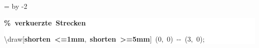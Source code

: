 \begingroup
\ttfamily
{}
=\textwidth
\advance{} by -2\fboxsep
\noindent
\colorbox{background}
{%
\parbox{\dimen255}
{%
\rule[-0.5ex]{0pt}{2.5ex}\hspace*{0.0em}\textcolor{G}{\textbf{\%~verkuerzte~Strecken}}\\
\rule[-0.5ex]{0pt}{2.5ex}\hspace*{0.0em}\textbackslash{}draw[\textcolor{R}{\textbf{shorten~{<}=1mm}},~\textcolor{R}{\textbf{shorten~{>}=5mm}}]~(0,~0)~{-}{-}~(3,~0);}%
}%
\endgroup
